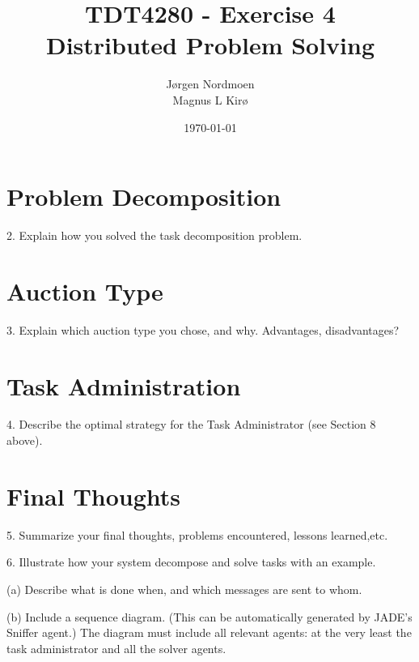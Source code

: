 \documentclass[12pt, a4paper]{article}
\title{
TDT4280 - Exercise 4 \\
Distributed Problem Solving
}
\author{
	Jørgen Nordmoen \\
        Magnus L Kirø \\
}
\date{\today}
\begin{document}
\maketitle
{}



\section{Problem Decomposition}
2. Explain how you solved the task decomposition problem.

\section{Auction Type}
3. Explain which auction type you chose, and why. Advantages, disadvantages?

\section{Task Administration}
4. Describe the optimal strategy for the Task Administrator (see Section 8 above).

\section{Final Thoughts}
5. Summarize your final thoughts, problems encountered, lessons learned,etc.

6. Illustrate how your system decompose and solve tasks with an example.

(a) Describe what is done when, and which messages are sent to whom.

(b) Include a sequence diagram. (This can be automatically generated by JADE's
Sniffer agent.) 
The diagram must include all relevant agents: at the very least the task administrator and all the solver agents.


\end{document}
